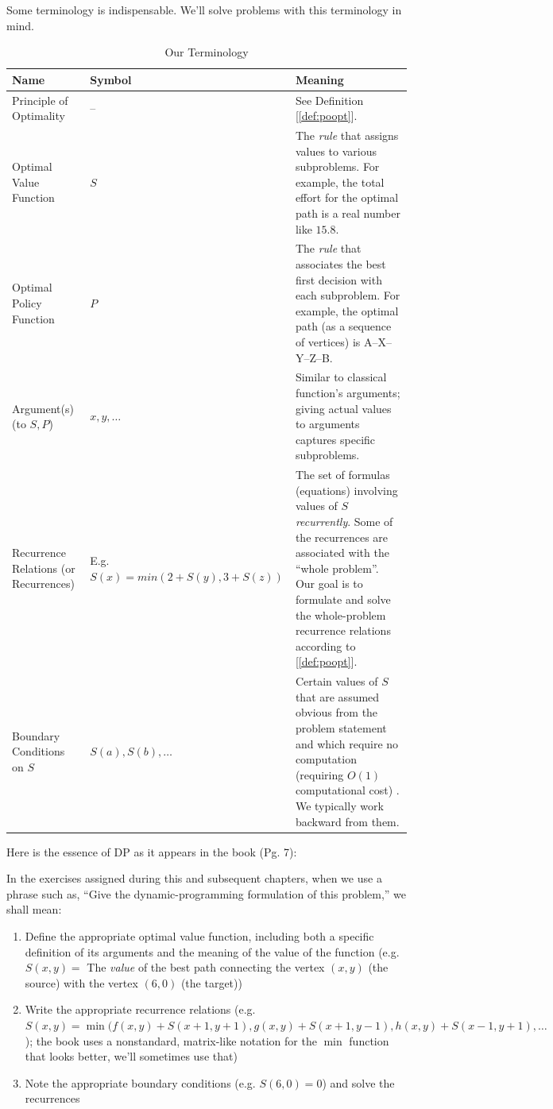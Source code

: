 \documentclass[english,notitlepage,smartquotes]{hgbreport}
\theoremstyle{definition}
\theoremstyle{definition}
\theoremstyle{remark}
\theoremstyle{definition}
\theoremstyle{plain}
\theoremstyle{definition}
\begin{document}
Some terminology is indispensable. We'll solve problems with this terminology in mind.
\begin{table}[h!]
\centering
\begin{tabular}{l|l|l}
Name&Symbol&Meaning\\
\hline
Principle of Optimality & -- & \multicolumn{1}{p{6cm}}{See Definition [\ref{def:poopt}].}\\
Optimal Value Function & $S$ & \multicolumn{1}{p{6cm}}{The \emph{rule} that assigns values to various subproblems. For example, the total effort for the optimal path is a real number like $15.8$.}\\
Optimal Policy Function & $P$ & \multicolumn{1}{p{6cm}}{The \emph{rule} that associates the best first decision with each subproblem. For example, the optimal path (as a sequence of vertices) is A--X--Y--Z--B.}\\
Argument(s) (to $S,P$) & $x,y,\dots$ & \multicolumn{1}{p{6cm}}{Similar to classical function's arguments; giving actual values to arguments captures specific subproblems.}\\
\multicolumn{1}{p{4cm}|}{\raggedright Recurrence Relations (or Recurrences)}& \multicolumn{1}{|p{3cm}|}{\raggedright E.g. $S(x)=min(2+S(y),3+S(z))$} & \multicolumn{1}{p{6cm}}{The set of formulas (equations) involving values of $S$ \textit{recurrently}. Some of the recurrences are associated with the ``whole problem''. Our goal is to formulate and solve the whole-problem recurrence relations according to [\ref{def:poopt}].}\\
Boundary Conditions on $S$ & $S(a),S(b),\dots$ & \multicolumn{1}{p{6cm}}{Certain values of $S$ that are assumed obvious from the problem statement and which require no computation (requiring $O(1)$ computational cost) . We typically work backward from them.}\\
\hline
\end{tabular}
\caption{Our Terminology}
\label{tab:dpterms}
\end{table}

Here is the essence of DP as it appears in the book (Pg. 7):

\hrulefill

In the exercises assigned during this and subsequent chapters, when we use a phrase such as, ``Give the dynamic-programming formulation of this problem,'' we shall mean: 
\begin{enumerate}
\item Define the appropriate optimal value function, including both a specific definition of its arguments and the meaning of the value of the function (e.g. $S(x,y)=$ The \textit{value} of the best path connecting the vertex $(x,y)$ (the source) with the vertex $(6,0)$ (the target))
\item Write the appropriate recurrence relations (e.g. $S(x,y)=\min(f(x,y) + S(x+1,y+1), g(x,y)+S(x+1,y-1), h(x,y)+S(x-1,y+1),\dots$); the book uses a nonstandard, matrix-like notation for the $\min$ function that looks better, we'll sometimes use that)
\item Note the appropriate boundary conditions (e.g. $S(6,0)=0$) and solve the recurrences
\end{enumerate}
\hrulefill
\end{document}
